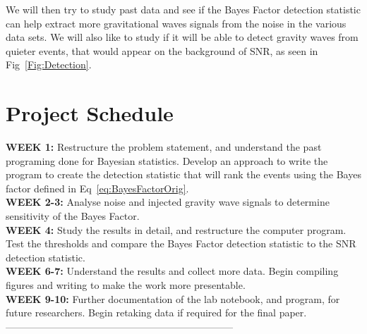 \documentclass{article}
\begin{document}
 We will then try to study past data and see if the Bayes Factor detection statistic can help extract more gravitational waves signals from the noise in the various data sets. We will also like to study if it will be able to detect gravity waves from quieter events, that would appear on the background of SNR, as seen in Fig~\ref{Fig:Detection}.
 
 
 
 
 
 \section{Project Schedule}
 
 
 \textbf{WEEK 1:} Restructure the problem statement, and understand the past programing done for Bayesian statistics. Develop an approach to write the program to create the detection statistic that will rank the events using the Bayes factor defined in Eq~\ref{eq:BayesFactorOrig}.\\
 \textbf{WEEK 2-3:} Analyse noise and injected gravity wave signals to determine sensitivity of the Bayes Factor.\\
 \textbf{WEEK 4:} Study the results in detail, and restructure the computer program. Test the thresholds and compare the Bayes Factor detection statistic to the SNR detection statistic. \\
  \textbf{WEEK 6-7:} Understand the results and collect more data. Begin compiling figures and writing to make the work more presentable. \\
  \textbf{WEEK 9-10:} Further documentation of the lab notebook, and program, for future researchers. Begin retaking data if required for the final paper.\\
 
 
 
 
 
---------------------------------------------------------------------
 
 
 
 
\end{document}
